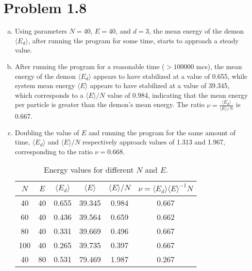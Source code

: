 \documentclass[12pt,a4paper,twocolumn]{article}
\begin{document}
\setcounter{page}{1}

\section*{Problem 1.8}
\begin{enumerate}[(a)]

\item Using parameters $N = 40$, $E = 40$, and $d = 3$, the mean energy of the demon $\langle E_d \rangle$, after running the program for some time, starts to approach a steady value.

\item After running the program for a reasonable time ($> 100000$ mcs), the mean energy of the demon $\langle E_d \rangle$ appears to have stabilized at a value of 0.655, while system mean energy $\langle E \rangle$ appears to have stabilized at a value of 39.345, which corresponds to a $\langle E \rangle / N$ value of 0.984, indicating that the mean energy per particle is greater than the demon's mean energy. The ratio $\nu = \frac{\langle E_d \rangle}{\langle E \rangle / N}$ is 0.667.

\item Doubling the value of $E$ and running the program for the same amount of time, $\langle E_d \rangle$ and $\langle E \rangle / N$ respectively approach values of 1.313 and 1.967, corresponding to the ratio $\nu = 0.668$.

\begin{table}[ph!]
    \centering
    \caption{Energy values for different $N$ and $E$.}
    \label{tab:energy}
    \begin{tabular}{|c|c|c|c|c|c|}
        \hline
        $N$ & $E$ & $\langle E_d \rangle$ & $\langle E \rangle$ & $\langle E \rangle/N$ & $\nu = \langle E_d \rangle \langle E \rangle^{-1} N$ \\ \hline \hline
        40 & 40 & 0.655 & 39.345 & 0.984 & 0.667 \\ \hline
        60 & 40 & 0.436 & 39.564 & 0.659 & 0.662 \\ \hline
        80 & 40 & 0.331 & 39.669 & 0.496 & 0.667 \\ \hline
        100 & 40 & 0.265 & 39.735 & 0.397 & 0.667 \\ \hline
        40 & 80 & 0.531 & 79.469 & 1.987 & 0.267 \\ \hline
    \end{tabular}
\end{table}

\end{enumerate}
\end{document}
